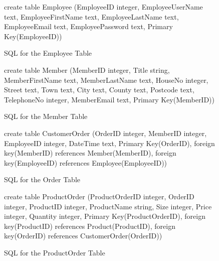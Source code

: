 \begin{figure}[H]
	 \caption{SQL for the Employee Table} \label{fig:employee-sql}
	\begin{sql}
	create table Employee
              (EmployeeID integer,
              EmployeeUserName text,
              EmployeeFirstName text,
              EmployeeLastName text,
              EmployeeEmail text,
              EmployeePassword text,
              Primary Key(EmployeeID))
	\end{sql}
\end{figure}

\begin{figure}[H]
	 \caption{SQL for the Member Table} \label{fig:member-sql}
	\begin{sql}
	create table Member
              (MemberID integer,
              Title string,
              MemberFirstName text,
              MemberLastName text,
              HouseNo integer,
              Street text,
              Town text,
              City text,
              County text,
              Postcode text,
              TelephoneNo integer,
              MemberEmail text,
              Primary Key(MemberID))
	\end{sql}
\end{figure}

\begin{figure}[H]
	 \caption{SQL for the Order Table} \label{fig:order-sql}
	\begin{sql}
	create table CustomerOrder
            (OrderID integer,
            MemberID integer,
            EmployeeID integer,
            DateTime text,
            Primary Key(OrderID),
            foreign key(MemberID) references Member(MemberID),
            foreign key(EmployeeID) references Employee(EmployeeID))
	\end{sql}
\end{figure}

\begin{figure}[H]
	 \caption{SQL for the ProductOrder Table} \label{fig:product-order-sql}
	\begin{sql}
	create table ProductOrder
            (ProductOrderID integer,
            OrderID integer,
            ProductID integer,
            ProductName string,
            Size integer,
            Price integer,
            Quantity integer,
            Primary Key(ProductOrderID),
            foreign key(ProductID) references Product(ProductID),
            foreign key(OrderID) references CustomerOrder(OrderID))
	\end{sql}
\end{figure}

